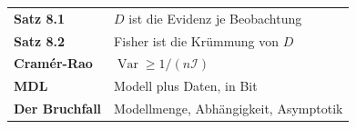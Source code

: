 \begin{merksatz}
\begin{center}
\renewcommand{\arraystretch}{1.5}
\begin{tabular}{@{}P{3.0cm}P{5.6cm}@{}}
\toprule
\textbf{Satz 8.1} & $D$ ist die Evidenz je Beobachtung\\
\textbf{Satz 8.2} & Fisher ist die Krümmung von $D$\\
\textbf{Cramér-Rao} & $\operatorname{Var} \ge 1/(n\mathcal{I})$\\
\textbf{MDL} & Modell plus Daten, in Bit\\
\textbf{Der Bruchfall} & Modellmenge, Abhängigkeit, Asymptotik\\
\bottomrule
\end{tabular}
\end{center}

\begin{center}
\begin{minipage}{0.88\textwidth}
\end{minipage}
\end{center}
\end{merksatz}
